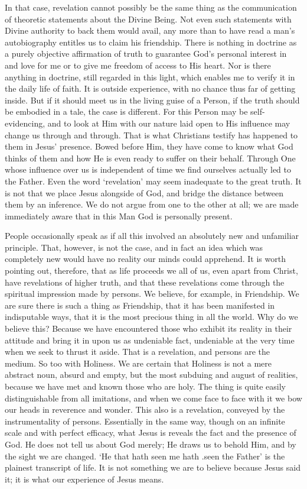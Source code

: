 \documentclass[12pt,a5paper]{article}
\begin{document}
In that case, revelation cannot possibly be the same thing as the communication of theoretic statements about the Divine Being. Not even such statements with Divine authority to back them would avail, any more than to have read a man's autobiography entitles us to claim his friendship. There is nothing in doctrine as a purely objective affirmation of truth to guarantee God's personal interest in and love for me or to give me freedom of access to His heart. Nor is there anything in doctrine, still regarded in this light, which enables me to verify it in the daily life of faith. It is outside experience, with no chance thus far of getting inside. But if it should meet us in the living guise of a Person, if the truth should be embodied in a tale, the case is different. For this Person may be self-evidencing, and to look at Him with our nature laid open to His influence may change us through and through. That is what Christians testify has happened to them in Jesus' presence. Bowed before Him, they have come to know what God thinks of them and how He is even ready to suffer on their behalf. Through One whose influence over us is independent of time we find ourselves actually led to the Father. Even the word `revelation' may seem inadequate to the great truth. It is not that we place Jesus alongside of God, and bridge the distance between them by an inference. We do not argue from one to the other at all; we are made immediately aware that in this Man God is personally present.

People occasionally speak as if all this involved an absolutely new and unfamiliar principle. That, however, is not the case, and in fact an idea which was completely new would have no reality our minds could apprehend. It is worth pointing out, therefore, that as life proceeds we all of us, even apart from Christ, have revelations of higher truth, and that these revelations come through the spiritual impression made by persons. We believe, for example, in Friendship. We are sure there is such a thing as Friendship, that it has been manifested in indisputable ways, that it is the most precious thing in all the world. Why do we believe this? Because we have encountered those who exhibit its reality in their attitude and bring it in upon us as undeniable fact, undeniable at the very time when we seek to thrust it aside. That is a revelation, and persons are the medium. So too with Holiness. We are certain that Holiness is not a mere abstract noun, absurd and empty, but the most subduing and august of realities, because we have met and known those who are holy. The thing is quite easily distinguishable from all imitations, and when we come face to face with it we bow our heads in reverence and wonder. This also is a revelation, conveyed by the instrumentality of persons. Essentially in the same way, though on an infinite scale and with perfect efficacy, what Jesus is reveals the fact and the presence of God. He does not tell us about God merely; He draws us to behold Him, and by the sight we are changed. `He that hath seen me hath .seen the Father' is
the plainest transcript of life. It is not something we are to believe because Jesus said it; it is what our experience of Jesus means. 
\end{document}
